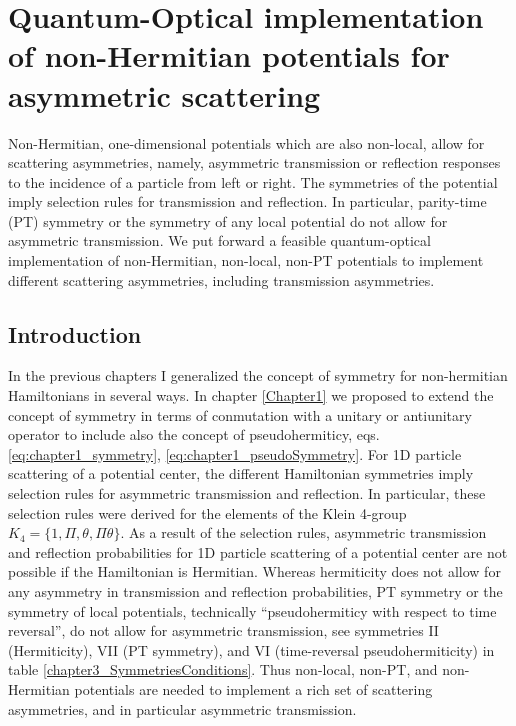 
\chapter{Quantum-Optical implementation of non-Hermitian potentials for asymmetric scattering}
\label{Chapter3}
%
Non-Hermitian, one-dimensional  potentials which are also non-local,
allow for scattering asymmetries, namely, asymmetric transmission or reflection responses to the incidence of a particle from left or right.
The  symmetries of the potential
imply selection rules for transmission and reflection. In particular, parity-time (PT)
symmetry or the symmetry  of any local potential do not allow for asymmetric transmission.
We put forward a feasible quantum-optical implementation
of non-Hermitian, non-local, non-PT potentials to implement different scattering asymmetries, including transmission
asymmetries.
%
\newpage
%
\section{Introduction}

In the previous chapters I generalized the concept of symmetry for non-hermitian Hamiltonians in several ways. In chapter \ref{Chapter1} we proposed to extend the concept of symmetry in terms of conmutation with a unitary or antiunitary operator to include also the concept of pseudohermiticy, eqs. \eqref{eq:chapter1_symmetry}, \eqref{eq:chapter1_pseudoSymmetry}. For 1D particle scattering of a potential center, the different Hamiltonian symmetries imply selection rules for asymmetric transmission and reflection. In particular, these selection rules were derived for the elements of the Klein 4-group $K_{4}=\lbrace 1,\Pi,\theta,\Pi\theta \rbrace$. As a result of the selection rules, asymmetric transmission and reflection probabilities for 1D particle scattering of a potential center are not possible if the Hamiltonian is Hermitian. Whereas hermiticity does not allow for any asymmetry in transmission and reflection probabilities, PT symmetry or the symmetry of local potentials, technically ``pseudohermiticy with respect to time reversal'', do not allow for asymmetric transmission, see symmetries II (Hermiticity), VII (PT symmetry),  and VI (time-reversal pseudohermiticity) in table \ref{chapter3_SymmetriesConditions}. Thus non-local, non-PT, and non-Hermitian potentials are needed to implement a rich set of scattering asymmetries, and in particular asymmetric transmission.


